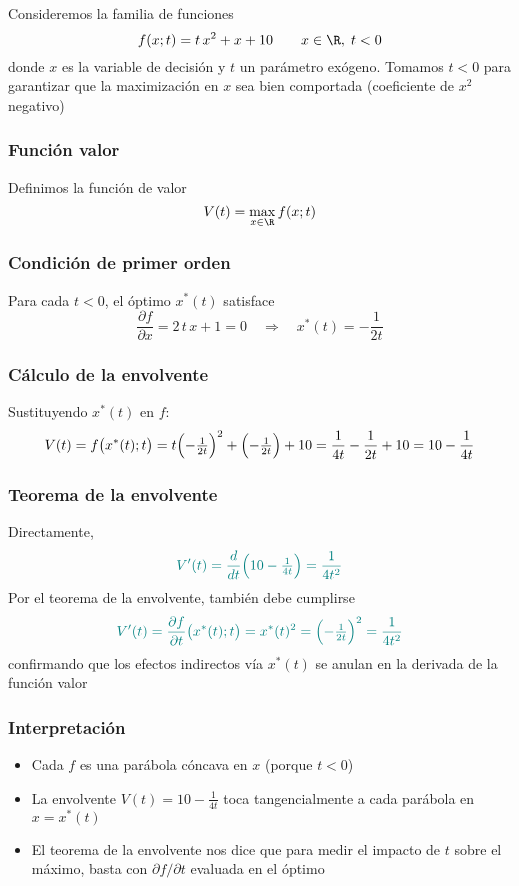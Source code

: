 \documentclass{article}
\begin{document}
Consideremos la familia de funciones
\[
f(x; t)=t\,x^2 + x + 10
\qquad x\in\R,\;t<0
\]
donde \(x\) es la variable de decisión y \(t\) un parámetro exógeno. Tomamos \(t<0\) para garantizar que la maximización en \(x\) sea bien comportada (coeficiente de \(x^2\) negativo)

\subsubsection*{Función valor}

Definimos la función de valor
\[
V(t)=\max_{x\in\R}f(x;t)
\]

\subsubsection*{Condición de primer orden}

Para cada \(t<0\), el óptimo \(x^*(t)\) satisface
\[
\frac{\partial f}{\partial x}
=2\,t\,x + 1=0
\quad\Longrightarrow\quad
x^*(t)=-\frac{1}{2t}
\]

\subsubsection*{Cálculo de la envolvente}

Sustituyendo \(x^*(t)\) en \(f\):
\[
V(t)
= f\bigl(x^*(t);t\bigr)
= t\Bigl(-\tfrac{1}{2t}\Bigr)^2
+ \Bigl(-\tfrac{1}{2t}\Bigr)
+ 10
= \frac{1}{4t} - \frac{1}{2t} + 10
= 10 - \frac{1}{4t}
\]

\subsubsection*{Teorema de la envolvente}

Directamente,
\[
\color{teal}
V'(t)
= \frac{d}{dt}\Bigl(10 - \tfrac{1}{4t}\Bigr)
= \frac{1}{4t^2}
\]
Por el teorema de la envolvente, también debe cumplirse
\[
\color{teal}
V'(t)
=\frac{\partial f}{\partial t}\bigl(x^*(t);t\bigr)
= x^*(t)^2
= \Bigl(-\tfrac{1}{2t}\Bigr)^2
= \frac{1}{4t^2}
\]
confirmando que los efectos indirectos vía \(x^*(t)\) se anulan en la derivada de la función valor

\subsubsection*{Interpretación}

\begin{itemize}
  \item Cada \(f\) es una parábola cóncava en \(x\) (porque \(t<0\))  
  \item La envolvente \(V(t)=10-\tfrac{1}{4t}\) toca tangencialmente a cada parábola en \(x=x^*(t)\)  
  \item El teorema de la envolvente nos dice que para medir el impacto de \(t\) sobre el máximo, basta con \(\partial f/\partial t\) evaluada en el óptimo
\end{itemize}
\end{document}
